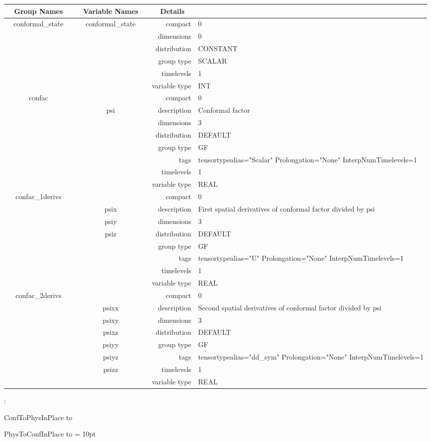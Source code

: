 \begin{tabular*}{150mm}{|c|c@{\extracolsep{\fill}}|rl|} \hline 
~ {\bf Group Names} ~ & ~ {\bf Variable Names} ~  &{\bf Details} ~ & ~\\ 
\hline 
conformal\_state & conformal\_state & compact & 0 \\ 
 &  & dimensions & 0 \\ 
 &  & distribution & CONSTANT \\ 
 &  & group type & SCALAR \\ 
 &  & timelevels & 1 \\ 
 &  & variable type & INT \\ 
\hline 
confac &  & compact & 0 \\ 
 & psi & description & Conformal factor \\ 
 &  & dimensions & 3 \\ 
 &  & distribution & DEFAULT \\ 
 &  & group type & GF \\ 
 &  & tags & tensortypealias="Scalar" Prolongation="None" InterpNumTimelevels=1 \\ 
 &  & timelevels & 1 \\ 
 &  & variable type & REAL \\ 
\hline 
confac\_1derivs &  & compact & 0 \\ 
 & psix & description & First spatial derivatives of conformal factor divided by psi \\ 
 & psiy & dimensions & 3 \\ 
 & psiz & distribution & DEFAULT \\ 
 &  & group type & GF \\ 
 &  & tags & tensortypealias="U" Prolongation="None" InterpNumTimelevels=1 \\ 
 &  & timelevels & 1 \\ 
 &  & variable type & REAL \\ 
\hline 
confac\_2derivs &  & compact & 0 \\ 
 & psixx & description & Second spatial derivatives of conformal factor divided by psi \\ 
 & psixy & dimensions & 3 \\ 
 & psixz & distribution & DEFAULT \\ 
 & psiyy & group type & GF \\ 
 & psiyz & tags & tensortypealias="dd\_sym" Prolongation="None" InterpNumTimelevels=1 \\ 
 & psizz & timelevels & 1 \\ 
 &  & variable type & REAL \\ 
\hline 
\end{tabular*} 



\vspace{5mm}

: 



ConfToPhysInPlace to 

PhysToConfInPlace to 
\vspace{2mm}\parskip = 10pt 
